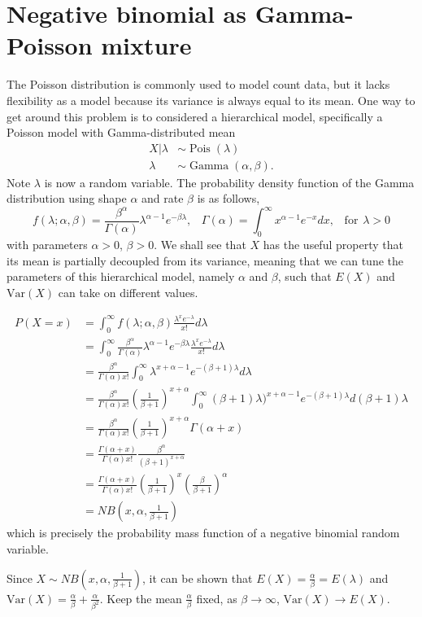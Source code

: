 \documentclass[11pt]{exam}
\begin{document}
  
  
\section{Negative binomial as Gamma-Poisson mixture} 
The Poisson distribution is commonly used to model count data, but it lacks flexibility as a model because its variance is always equal to its mean. One way to get around this problem is to considered a hierarchical model, specifically a Poisson model with Gamma-distributed mean
\begin{equation}
	\begin{split}
		X|\lambda &\sim \operatorname{Pois}(\lambda) \\
		\lambda &\sim \operatorname{Gamma}\left(\alpha, \beta \right).
	\end{split}
\end{equation}
Note $\lambda$ is now a random variable. The probability density function of the Gamma distribution using shape $\alpha$ and rate $\beta$ is as follows,
\begin{equation}
	f(\lambda; \alpha, \beta)=\frac{\beta^{\alpha}}{\Gamma(\alpha)} \lambda^{\alpha-1} e^{-\beta \lambda}, \hspace{10pt} \Gamma(\alpha) = \int_{0}^{\infty} x^{\alpha-1} e^{-x} dx, \hspace{10pt} \mathrm{for} \hspace{5pt} \lambda >0
\end{equation}
with parameters $\alpha>0$, $\beta>0$. We shall see that $X$ has the useful property that its mean is partially decoupled from its variance, meaning that we can tune the parameters of this hierarchical model, namely $\alpha$ and $\beta$, such that  $E(X)$ and $\mathrm{Var}(X)$ can take on different values.

\begin{align*}
    P(X=x)&=\int_0^{\infty} f(\lambda; \alpha, \beta) \frac{\lambda^x e^{-\lambda}}{x!}d\lambda\\
     &=\int_0^{\infty} \frac{\beta^{\alpha}}{\Gamma(\alpha)} \lambda^{\alpha-1} e^{-\beta \lambda} \frac{\lambda^x e^{-\lambda}}{x!}d\lambda \\
    &=\frac{\beta^{\alpha}}{\Gamma(\alpha)x!} \int_0^{\infty} \lambda^{x+\alpha-1} e^{-(\beta+1) \lambda} d\lambda\\
    &=\frac{\beta^{\alpha}}{\Gamma(\alpha)x!} (\frac{1}{\beta+1})^{x+\alpha}\int_0^{\infty} (\beta+1)\lambda)^{x+\alpha-1} e^{-(\beta+1) \lambda} d(\beta+1)\lambda\\
    &=\frac{\beta^{\alpha}}{\Gamma(\alpha)x!} (\frac{1}{\beta+1})^{x+\alpha}\Gamma(\alpha+x)\\
    &=\frac{\Gamma(\alpha+x)}{\Gamma(\alpha)x!} \frac{\beta^{\alpha}}{(\beta+1)^{x+\alpha}}\\
    &= \frac{\Gamma(\alpha+x)}{\Gamma(\alpha)x!} (\frac{1}{\beta+1})^{x} (\frac{\beta}{\beta+1})^{\alpha}\\
    &= NB(x,\alpha,\frac{1}{\beta+1})
\end{align*}
which is precisely the probability mass function of a negative binomial random variable.

 Since $X \sim NB(x,\alpha,\frac{1}{\beta+1})$, it can be shown that $E(X) = \frac{\alpha}{\beta}=E(\lambda)$
and $\mathrm{Var}(X) = \frac{\alpha}{\beta} + \frac{\alpha}{\beta^2} $. Keep the mean $\frac{\alpha}{\beta}$ fixed, as $\beta \rightarrow \infty$, $\mathrm{Var}(X) \rightarrow E(X)$. 
\end{document}
